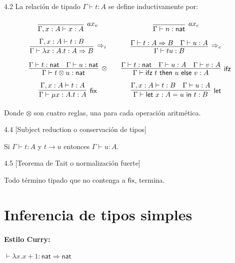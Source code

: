 \documentclass[twoside,a4paper,12pt]{article}
\theoremstyle{definition}
\theoremstyle{remark}
\newcommand\fix[2]{\ensuremath{\mathsf{\mu}#1.#2}}
\newcommand\fun[2]{\ensuremath{\lambda {#1}{.}{#2}}}
\newcommand\ifz[3]{\ensuremath{\mathsf{ifz~}#1\mathsf{~then~}#2\mathsf{~else~}#3}}
\newcommand\letl[3]{\ensuremath{\mathsf{let~}#1=#2\mathsf{~in~}#3}}
\newcommand\nat{\ensuremath{\mathsf{nat}}}
\begin{document}
\begin{definicion}{4.2}
  \label{def:ST}
  La relación de tipado $\Gamma\vdash t:A$ se define inductivamente por:
  \[\arraycolsep=10pt\def\arraystretch{2.6}
    \begin{array}{cc}
      \infer[ax_v]
      {\Gamma,x:A\vdash x:A}
      {}
      &
        \infer[ax_c]
        {\Gamma\vdash n:\nat}
        {}
      \\
      \infer[\Rightarrow_i]
      {\Gamma\vdash\fun{x:A}t:A\Rightarrow B}
      {\Gamma,x:A\vdash t:B}
      &
        \infer[\Rightarrow_e]
        {\Gamma\vdash tu:B}
        {\Gamma\vdash t:A\Rightarrow B & \Gamma\vdash u:A}
      \\
      \infer[\otimes]
      {\Gamma\vdash t\otimes u:\nat}
      {\Gamma\vdash t:\nat & \Gamma\vdash u:\nat}
      &
        \infer[\mathsf{ifz}]
        {\Gamma\vdash\ifz tuv:A}
        {\Gamma\vdash t:\nat & \Gamma\vdash u:A & \Gamma\vdash v:A}
      \\
      \infer[\mathsf{fix}]
      {\Gamma\vdash\fix{x:A}t:A}
      {\Gamma,x:A\vdash t:A}
      &
        \infer[\mathsf{let}]
        {\Gamma\vdash\letl{x:A}ut:B}
        {\Gamma,x:A\vdash t:B & \Gamma\vdash u:A}
    \end{array}
  \]
  Donde $\otimes$ son cuatro reglas, una para cada operación aritmética.
\end{definicion}

\begin{teorema}{4.4}
  [Subject reduction o conservación de tipos]
  \label{thm:SR}
  ~

  Si $\Gamma\vdash t:A$ y $t\to u$ entonces $\Gamma\vdash u:A$.
\end{teorema}

\begin{teorema}{4.5}
  [Teorema de Tait o normalización fuerte]
  \label{thm:SN}
  ~

  Todo término tipado que no contenga a $\mathsf{fix}$, termina.
\end{teorema}

\newpage
\section*{Inferencia de tipos simples}

\paragraph{Estilo Curry:} $\vdash\fun x{x+1}:\nat\Rightarrow\nat$
\end{document}
